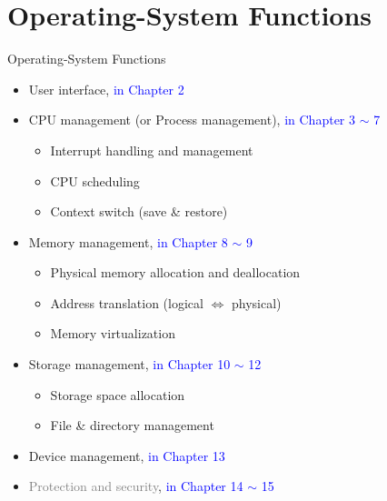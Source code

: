 \documentclass[10pt]{beamer}
\begin{document}
\section[6.Functions]{Operating-System Functions}
\begin{frame}{Operating-System Functions}
\footnotesize
\begin{itemize}
    \item User interface, \textcolor{blue}{in Chapter 2}
    \item CPU management (or \alert{Process management}), \textcolor{blue}{in Chapter 3 $\sim$ 7}
    \begin{itemize}
    \scriptsize
        \item Interrupt handling and management
        \item CPU scheduling
        \item Context switch (save \& restore)
    \end{itemize}
    \item \alert{Memory management}, \textcolor{blue}{in Chapter 8 $\sim$ 9}
    \begin{itemize}
    \scriptsize
        \item Physical memory allocation and deallocation
        \item Address translation (logical $\Leftrightarrow$ physical)
        \item Memory virtualization 
    \end{itemize}
    \item \alert{Storage management}, \textcolor{blue}{in Chapter 10 $\sim$ 12}
    \begin{itemize}
    \scriptsize
        \item Storage space allocation
        \item File \& directory management
    \end{itemize}
    \item Device management, \textcolor{blue}{in Chapter 13}
    \item \textcolor{gray}{Protection and security}, \textcolor{blue}{in Chapter 14 $\sim$ 15}
\end{itemize}
\end{frame}
\end{document}
